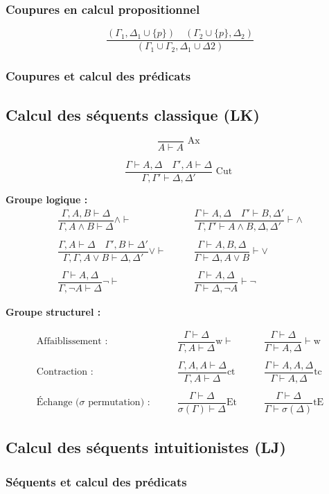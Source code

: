 \documentclass[french]{article}
\begin{document}
\subsubsection{Coupures en calcul propositionnel}

\[\dfrac{(\Gamma_1,\Delta_1\cup\{p\}) \quad (\Gamma_2\cup\{p\}, \Delta_2)}{(\Gamma_1\cup\Gamma_2, \Delta_1\cup\Delta2)}\]


\subsubsection{Coupures et calcul des prédicats}


\subsection{Calcul des séquents classique (LK)}

\[\dfrac{}{A \vdash A} \text{ Ax }\]

\[\dfrac{\Gamma \vdash A,\Delta \quad \Gamma',A \vdash \Delta}{\Gamma,\Gamma' \vdash \Delta, \Delta'} \text{ Cut }\]

\textbf{Groupe logique :}
\begin{align*}
\dfrac{\Gamma,A,B \vdash \Delta}{\Gamma, A \land B \vdash \Delta} \land \vdash &\qquad 
\dfrac{\Gamma \vdash A,\Delta \quad \Gamma' \vdash B,\Delta'}{\Gamma,\Gamma' \vdash A \land B, \Delta, \Delta'} \vdash \land \\ 
\\
\dfrac{\Gamma, A \vdash\Delta \quad \Gamma', B \vdash \Delta'}{\Gamma,\Gamma,  A \lor B \vdash \Delta, \Delta'} \lor \vdash    &\qquad 
\dfrac{\Gamma \vdash A, B, \Delta}{\Gamma \vdash \Delta, A \lor B} \vdash \lor\\
\\
\dfrac{\Gamma \vdash A, \Delta}{\Gamma, \neg A \vdash \Delta} \neg \vdash  &\qquad 
\dfrac{\Gamma \vdash A,\Delta}{\Gamma \vdash \Delta, \neg A} \vdash \neg
\end{align*}

\textbf{Groupe structurel :}

\begin{align*}
\text{Affaiblissement :} &\qquad \dfrac{\Gamma\vdash\Delta}{\Gamma, A\vdash\Delta}\text{w}\vdash &\qquad
\dfrac{\Gamma\vdash\Delta}{\Gamma\vdash A,\Delta}\vdash\text{w}\\
\\
\text{Contraction :} &\qquad\dfrac{\Gamma, A, A\vdash\Delta}{\Gamma, A\vdash\Delta}\text{ct} &\qquad
\dfrac{\Gamma\vdash A, A,\Delta}{\Gamma\vdash A,\Delta}\text{tc}\\
\\
\text{Échange ($\sigma$ permutation) :}&\qquad\dfrac{\Gamma\vdash\Delta}{\sigma (\Gamma)\vdash\Delta}\text{Et} &\qquad
\dfrac{\Gamma\vdash\Delta}{\Gamma\vdash\sigma (\Delta)}\text{tE}
\end{align*}



\subsection{Calcul des séquents intuitionistes (LJ)}


\subsubsection{Séquents et calcul des prédicats}

\end{document}
